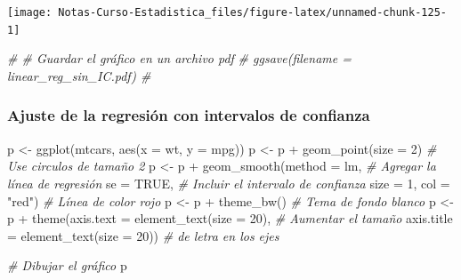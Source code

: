 \documentclass[
  12pt,
]{book}
\newenvironment{Shaded}{\begin{snugshade}}{\end{snugshade}}
\newcommand{\AttributeTok}[1]{\textcolor[rgb]{0.77,0.63,0.00}{#1}}
\newcommand{\CommentTok}[1]{\textcolor[rgb]{0.56,0.35,0.01}{\textit{#1}}}
\newcommand{\ConstantTok}[1]{\textcolor[rgb]{0.00,0.00,0.00}{#1}}
\newcommand{\DecValTok}[1]{\textcolor[rgb]{0.00,0.00,0.81}{#1}}
\newcommand{\FunctionTok}[1]{\textcolor[rgb]{0.00,0.00,0.00}{#1}}
\newcommand{\NormalTok}[1]{#1}
\newcommand{\OtherTok}[1]{\textcolor[rgb]{0.56,0.35,0.01}{#1}}
\newcommand{\SpecialCharTok}[1]{\textcolor[rgb]{0.00,0.00,0.00}{#1}}
\newcommand{\StringTok}[1]{\textcolor[rgb]{0.31,0.60,0.02}{#1}}
\theoremstyle{definition}
\theoremstyle{definition}
\theoremstyle{definition}
\theoremstyle{definition}
\theoremstyle{remark}
\begin{document}
\begin{center}\texttt{[image: Notas-Curso-Estadistica\_files/figure-latex/unnamed-chunk-125-1]} \end{center}

\begin{Shaded}
\begin{Highlighting}[]
\CommentTok{\# \# Guardar el gráfico en un archivo pdf}
\CommentTok{\# ggsave(filename = \textquotesingle{}linear\_reg\_sin\_IC.pdf\textquotesingle{}) \# }
\end{Highlighting}
\end{Shaded}

\hypertarget{ajuste-de-la-regresiuxf3n-con-intervalos-de-confianza}{%
\subsubsection{Ajuste de la regresión con intervalos de confianza}\label{ajuste-de-la-regresiuxf3n-con-intervalos-de-confianza}}

\begin{Shaded}
\begin{Highlighting}[]
\NormalTok{p }\OtherTok{\textless{}{-}} \FunctionTok{ggplot}\NormalTok{(mtcars, }\FunctionTok{aes}\NormalTok{(}\AttributeTok{x =}\NormalTok{ wt, }\AttributeTok{y =}\NormalTok{ mpg)) }
\NormalTok{p }\OtherTok{\textless{}{-}}\NormalTok{ p }\SpecialCharTok{+} \FunctionTok{geom\_point}\NormalTok{(}\AttributeTok{size =} \DecValTok{2}\NormalTok{)       }\CommentTok{\# Use circulos de tamaño 2}
\NormalTok{p }\OtherTok{\textless{}{-}}\NormalTok{ p }\SpecialCharTok{+} \FunctionTok{geom\_smooth}\NormalTok{(}\AttributeTok{method =}\NormalTok{ lm,   }\CommentTok{\# Agregar la línea de regresión }
              \AttributeTok{se =} \ConstantTok{TRUE}\NormalTok{,            }\CommentTok{\# Incluir el intervalo de confianza   }
              \AttributeTok{size =} \DecValTok{1}\NormalTok{,}
              \AttributeTok{col =} \StringTok{"red"}\NormalTok{)          }\CommentTok{\# Línea de color rojo }
\NormalTok{p }\OtherTok{\textless{}{-}}\NormalTok{ p }\SpecialCharTok{+} \FunctionTok{theme\_bw}\NormalTok{()                 }\CommentTok{\# Tema de fondo blanco}
\NormalTok{p }\OtherTok{\textless{}{-}}\NormalTok{ p }\SpecialCharTok{+} \FunctionTok{theme}\NormalTok{(}\AttributeTok{axis.text =} \FunctionTok{element\_text}\NormalTok{(}\AttributeTok{size =} \DecValTok{20}\NormalTok{),  }\CommentTok{\# Aumentar el tamaño }
               \AttributeTok{axis.title =} \FunctionTok{element\_text}\NormalTok{(}\AttributeTok{size =} \DecValTok{20}\NormalTok{)) }\CommentTok{\# de letra en los ejes}

\CommentTok{\# Dibujar el gráfico}
\NormalTok{p   }
\end{Highlighting}
\end{Shaded}
\end{document}
